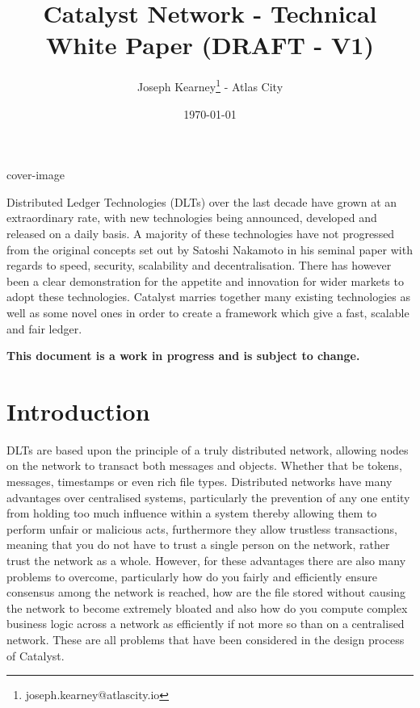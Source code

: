 \documentclass{article}
\title{\textbf{Catalyst Network - Technical White Paper (DRAFT - V1)}}
\date{\today}
\author{Joseph Kearney\thanks{joseph.kearney@atlascity.io} - Atlas City}
\begin{document}
 {cover-image}

\maketitle

\abstract

Distributed Ledger Technologies (DLTs) over the last decade have grown at an extraordinary rate, with new technologies being announced, developed and released on a daily basis. A majority of these technologies have not progressed from the original concepts set out by Satoshi Nakamoto in his seminal paper \cite{nakamoto2008bitcoin} with regards to speed, security, scalability and decentralisation. There has however been a clear demonstration for the appetite and innovation for wider markets to adopt these technologies. Catalyst marries together many existing technologies as well as some novel ones in order to create a framework which give a fast, scalable and fair ledger.

\begin{center}
\vspace{50mm}
\textbf{This document is a work in progress and is subject to change.}
\end{center}

\newpage

{
  \hypersetup{linkcolor=black}
  \tableofcontents
}
\newpage

\section*{Introduction}

DLTs are based upon the principle of a truly distributed network, allowing nodes on the network to transact both messages and objects. Whether that be tokens, messages, timestamps or even rich file types. Distributed networks have many advantages over centralised systems, particularly the prevention of any one entity from holding too much influence within a system thereby allowing them to perform unfair or malicious acts, furthermore they allow trustless transactions, meaning that you do not have to trust a single person on the network, rather trust the network as a whole. However, for these advantages there are also many problems to overcome, particularly how do you fairly and efficiently ensure consensus among the network is reached, how are the file stored without causing the network to become extremely bloated and also how do you compute complex business logic across a network as efficiently if not more so than on a centralised network. These are all problems that have been considered in the design process of Catalyst. \\
\end{document}

